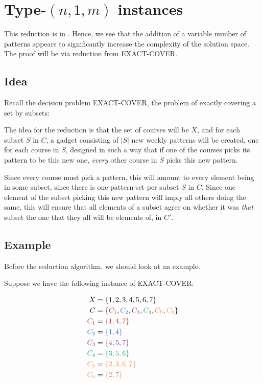 \section{Type-$(n, 1, m)$ instances}

This reduction is in \nph. Hence, we see that the addition of a variable number of patterns appears to significantly increase the complexity of the solution space. The proof will be via reduction from EXACT-COVER.

\subsection{Idea}
Recall the decision problem EXACT-COVER, the problem of exactly covering a set by subsets:


The idea for the reduction is that the set of courses will be $X$, and for each subset $S$ in $C$, a gadget consisting of $|S|$ new weekly patterns will be created, one for each course in $S$, designed in such a way that if one of the courses picks its pattern to be this new one, \emph{every} other course in $S$ picks this new pattern.

Since every course must pick a pattern, this will amount to every element being in some subset, since there is one pattern-set per subset $S$ in $C$. Since one element of the subset picking this new pattern will imply all others doing the same, this will ensure that all elements of a subset agree on whether it was \emph{that} subset the one that they all will be elements of, in $C'$.

\subsection{Example}
Before the reduction algorithm, we should look at an example.

Suppose we have the following instance of EXACT-COVER:

\begin{align*}
X &= \{1, 2, 3, 4, 5, 6, 7\}\\
C &= \{{\color{BrickRed}C_1}, {\color{NavyBlue}C_2}, {\color{Fuchsia}C_3}, {\color{ForestGreen}C_4}, {\color{BurntOrange}C_5}, {\color{Tan}C_6}\}\\
{\color{BrickRed} C_1} &= {\color{BrickRed} \{1, 4, 7\}}\\
{\color{NavyBlue} C_2} &= {\color{NavyBlue}\{ 1, 4 \} }\\
{\color{Fuchsia} C_3} &= {\color{Fuchsia} \{ 4, 5, 7\} }\\
{\color{ForestGreen} C_4} &= {\color{ForestGreen} \{ 3, 5, 6\} }\\
{\color{BurntOrange} C_5} &= {\color{BurntOrange} \{ 2, 3, 6, 7 \}}\\
{\color{Tan} C_6} &= {\color{Tan} \{2, 7\}}
\end{align*}

